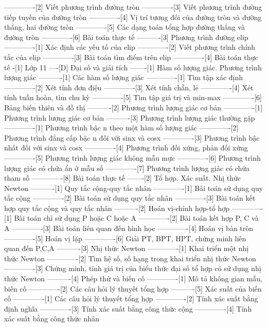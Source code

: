 -------------[2] Viết phương trình đường tròn
-------------[3] Viết phương trình đường tiếp tuyến của đường tròn
-------------[4] Vị trí tương đối của đường tròn và đường thẳng, hai đường tròn
-------------[5] Các dạng toán tổng hợp đường thẳng và đường tròn
-------------[6] Bài toán thực tế
----------[3] Phương trình đường elip
-------------[1] Xác định các yếu tố của elip
-------------[2] Viết phương trình chính tắc của elip
-------------[3] Bài toán tìm điểm trên elip
-------------[4] Bài toán thực tế
-[1] Lớp 11
----[D] Đại số và giải tích
-------[1] Hàm số lượng giác. Phương trình lượng giác
----------[1] Các hàm số lượng giác
-------------[1] Tìm tập xác định
-------------[2] Xét tính đơn điệu
-------------[3] Xét tính chẵn, lẻ
-------------[4] Xét tính tuần hoàn, tìm chu kỳ
-------------[5] Tìm tập giá trị và min-max
-------------[6] Bảng biến thiên và đồ thị
----------[2] Phương trình lượng giác cơ bản
-------------[1] Phương trình lượng giác cơ bản
----------[3] Phương trình lượng giác thường gặp
-------------[1] Phương trình bậc n theo một hàm số lượng giác
-------------[2] Phương trình đẳng cấp bậc n đối với sinx và cosx
-------------[3] Phương trình bậc nhất đối với sinx và cosx
-------------[4] Phương trình đối xứng, phản đối xứng
-------------[5] Phương trình lượng giác không mẫu mực
-------------[6] Phương trình lượng giác có chứa ẩn ở mẫu số
-------------[7] Phương trình lượng giác có chứa tham số
-------------[8] Bài toán thực tế
-------[2] Tổ hợp. Xác suất. Nhị thức Newton
----------[1] Quy tắc cộng-quy tắc nhân
-------------[1] Bài toán sử dụng quy tắc cộng
-------------[2] Bài toán sử dụng quy tắc nhân
-------------[3] Bài toán kết hợp quy tắc cộng và quy tắc nhân
----------[2] Hoán vị-chỉnh hợp-tổ hợp
-------------[1] Bài toán chỉ sử dụng P hoặc C hoặc A
-------------[2] Bài toán kết hợp P, C và A
-------------[3] Bài toán liên quan đến hình học
-------------[4] Hoán vị bàn tròn
-------------[5] Hoán vị lặp
-------------[6] Giải PT, BPT, HPT, chứng minh liên quan đến P,C,A
----------[3] Nhị thức Newton
-------------[1] Khai triển một nhị thức Newton
-------------[2] Tìm hệ số, số hạng trong khai triển nhị thức Newton
-------------[3] Chứng minh, tính giá trị của biểu thức đại số tổ hợp có sử dụng nhị thức Newton
----------[4] Phép thử và biến cố
-------------[1] Mô tả không gian mẫu, biến cố
-------------[2] Các câu hỏi lý thuyết tổng hợp
----------[5] Xác suất của biến cố
-------------[1] Các câu hỏi lý thuyết tổng hợp
-------------[2] Tính xác suất bằng định nghĩa
-------------[3] Tính xác suất bằng công thức cộng
-------------[4] Tính xác suất bằng công thức nhân
